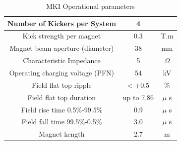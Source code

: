 \begin{table}
\caption{MKI Operational parameters}

\begin{center}
\begin{tabular}{c | c | c}
Number of Kickers per System & 4 & \\ \hline
Kick strength per magnet & 0.3 & T.m \\ \hline
Magnet beam aperture (diameter) & 38 & mm \\ \hline
Characteristic Impedance & 5 & $\Omega$ \\ \hline
Operating charging voltage (PFN) & 54 & kV \\ \hline
Field flat top ripple & < $\pm$0.5 & \% \\ \hline
Field flat top duration & up to 7.86 & $\mu$ s \\ \hline
Field rise time 0.5\%-99.5\% & 0.9 & $\mu$ s \\ \hline
Field fall time 99.5\%-0.5\% & 3.0 & $\mu$ s \\ \hline
Magnet kength & 2.7 & m \\ 
\end{tabular}
\end{center}
\label{tab:mki-parameters}
\end{table}